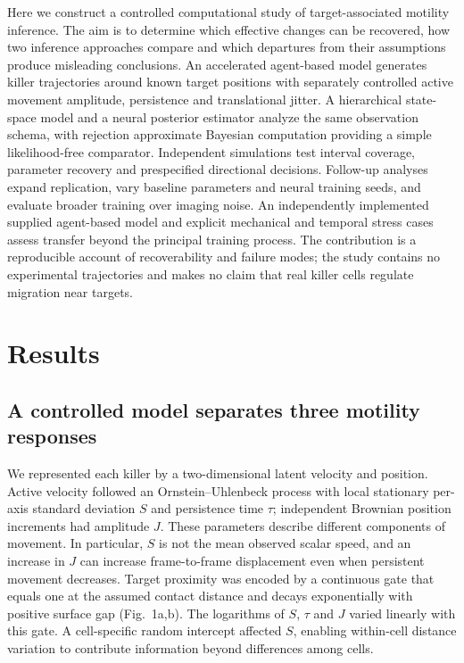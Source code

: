 \documentclass[12pt]{article}
\begin{document}
Here we construct a controlled computational study of target-associated motility inference. The aim is to determine which effective changes can be recovered, how two inference approaches compare and which departures from their assumptions produce misleading conclusions. An accelerated agent-based model generates killer trajectories around known target positions with separately controlled active movement amplitude, persistence and translational jitter. A hierarchical state-space model and a neural posterior estimator analyze the same observation schema, with rejection approximate Bayesian computation providing a simple likelihood-free comparator. Independent simulations test interval coverage, parameter recovery and prespecified directional decisions. Follow-up analyses expand replication, vary baseline parameters and neural training seeds, and evaluate broader training over imaging noise. An independently implemented supplied agent-based model and explicit mechanical and temporal stress cases assess transfer beyond the principal training process. The contribution is a reproducible account of recoverability and failure modes; the study contains no experimental trajectories and makes no claim that real killer cells regulate migration near targets.

\section*{Results}
\subsection*{A controlled model separates three motility responses}
We represented each killer by a two-dimensional latent velocity and position. Active velocity followed an Ornstein--Uhlenbeck process with local stationary per-axis standard deviation $S$ and persistence time $\tau$; independent Brownian position increments had amplitude $J$. These parameters describe different components of movement. In particular, $S$ is not the mean observed scalar speed, and an increase in $J$ can increase frame-to-frame displacement even when persistent movement decreases. Target proximity was encoded by a continuous gate that equals one at the assumed contact distance and decays exponentially with positive surface gap (Fig.~1a,b). The logarithms of $S$, $\tau$ and $J$ varied linearly with this gate. A cell-specific random intercept affected $S$, enabling within-cell distance variation to contribute information beyond differences among cells.
\end{document}
